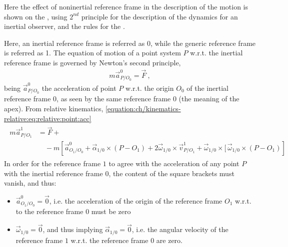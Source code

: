 \documentclass[letterpaper,10pt,english]{jupyterBook}
\begin{document}
\sphinxAtStartPar
Here the effect of non\sphinxhyphen{}inertial reference frame in the description of the motion is shown on the , using \(2^{nd}\) principle for the description of the dynamics for an inertial observer, and the rules for the {\hyperref[\detokenize{ch/kinematics-relative:classical-mechanics-kinematics-relative-points}]{}}.

\sphinxAtStartPar
Here, an inertial reference frame is referred as 0, while the generic reference frame is referred as 1. The equation of motion of a point system \(P\) w.r.t. the inertial reference frame is governed by Newton’s second principle,
\begin{equation*}
\begin{split}m \vec{a}^{0}_{P/O_0} = \vec{F} \ ,\end{split}
\end{equation*}
\sphinxAtStartPar
being \(\vec{a}^0_{P/O_0}\) the acceleration of point \(P\) w.r.t. the origin \(O_0\) of the inertial reference frame \(0\), as seen by the same reference frame \(0\) (the meaning of the apex).
From relative kinematics, \eqref{equation:ch/kinematics-relative:eq:relative:point:acc}
\begin{equation*}
\begin{split}\begin{aligned}
  m \vec{a}^{1}_{P/O_1} & =  \vec{F}  + \\
   & \quad - m \left[ \vec{a}^0_{O_1/O_0} + \vec{\alpha}_{1/0} \times (P - O_1) + 2 \vec{\omega}_{1/0} \times \vec{v}^1_{P/O_1} + \vec{\omega}_{1/0} \times [ \, \vec{\omega}_{1/0} \times (P - O_1) \right]
\end{aligned}\end{split}
\end{equation*}
\sphinxAtStartPar
In order for the reference frame \(1\) to agree with the acceleration of any point \(P\) with the inertial reference frame \(0\), the content of the square brackets must vanish, and thus:
\begin{itemize}
\item {} 
\sphinxAtStartPar
\(\vec{a}^0_{O_1/O_0} = \vec{0}\), i.e. the acceleration of the origin of the reference frame \(O_1\) w.r.t. to the reference frame \(0\) must be zero

\item {} 
\sphinxAtStartPar
\(\vec{\omega}_{1/0} = \vec{0}\), and thus implying \(\vec{\alpha}_{1/0}= \vec{0}\), i.e. the angular velocity of the reference frame \(1\) w.r.t. the reference frame \(0\) are zero.

\end{itemize}
\end{document}
